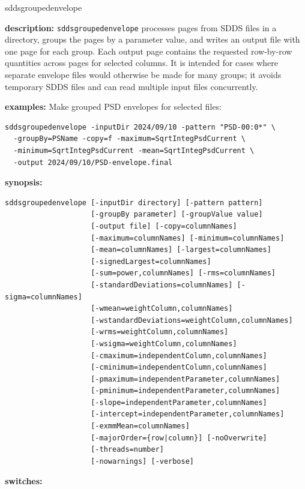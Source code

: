 \begin{sddsprog}{sddsgroupedenvelope}
  \item \textbf{description:} {\tt sddsgroupedenvelope} processes pages from SDDS files in a directory, groups the pages by a parameter value, and writes an output file with one page for each group. Each output page contains the requested row-by-row quantities across pages for selected columns. It is intended for cases where separate envelope files would otherwise be made for many groups; it avoids temporary SDDS files and can read multiple input files concurrently.
  \item \textbf{examples:} Make grouped PSD envelopes for selected files:
  \begin{verbatim}
sddsgroupedenvelope -inputDir 2024/09/10 -pattern "PSD-00:0*" \
  -groupBy=PSName -copy=f -maximum=SqrtIntegPsdCurrent \
  -minimum=SqrtIntegPsdCurrent -mean=SqrtIntegPsdCurrent \
  -output 2024/09/10/PSD-envelope.final
  \end{verbatim}
  \item \textbf{synopsis:}
  \begin{verbatim}
sddsgroupedenvelope [-inputDir directory] [-pattern pattern]
                    [-groupBy parameter] [-groupValue value]
                    [-output file] [-copy=columnNames]
                    [-maximum=columnNames] [-minimum=columnNames]
                    [-mean=columnNames] [-largest=columnNames]
                    [-signedLargest=columnNames]
                    [-sum=power,columnNames] [-rms=columnNames]
                    [-standardDeviations=columnNames] [-sigma=columnNames]
                    [-wmean=weightColumn,columnNames]
                    [-wstandardDeviations=weightColumn,columnNames]
                    [-wrms=weightColumn,columnNames]
                    [-wsigma=weightColumn,columnNames]
                    [-cmaximum=independentColumn,columnNames]
                    [-cminimum=independentColumn,columnNames]
                    [-pmaximum=independentParameter,columnNames]
                    [-pminimum=independentParameter,columnNames]
                    [-slope=independentParameter,columnNames]
                    [-intercept=independentParameter,columnNames]
                    [-exmmMean=columnNames]
                    [-majorOrder={row|column}] [-noOverwrite]
                    [-threads=number]
                    [-nowarnings] [-verbose]
  \end{verbatim}
  \item \textbf{switches:}
  \begin{itemize}

\end{itemize}
\end{sddsprog}
